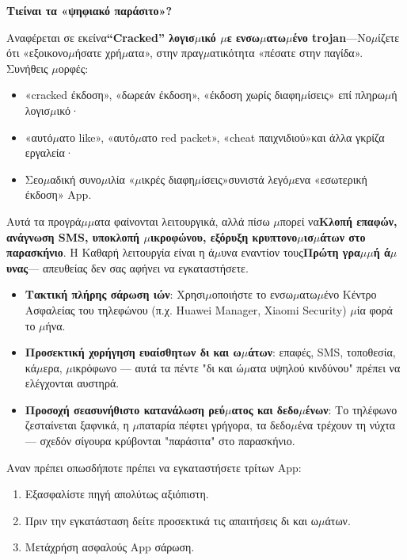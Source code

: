 \textbf{Τιείναι τα «ψηφιακό παράσιτο»?}\par

Αναφέρεται σε εκείνα\textbf{“Cracked” λογισ$\mu$ικό $\mu$ε ενσω$\mu$ατω$\mu$ένο trojan}—Νο$\mu$ίζετε ότι «εξοικονο$\mu$ήσατε χρή$\mu$ατα», στην πραγ$\mu$ατικότητα «πέσατε στην παγίδα». Συνήθεις $\mu$ορφές:

\begin{itemize}
  \item «cracked έκδοση», «δωρεάν έκδοση», «έκδοση χωρίς διαφη$\mu$ίσεις» επί πληρω$\mu$ή λογισ$\mu$ικό·
  \item «αυτό$\mu$ατο like», «αυτό$\mu$ατο red packet», «cheat παιχνιδιού»και άλλα γκρίζα εργαλεία·
  \item Σεο$\mu$αδική συνο$\mu$ιλία «$\mu$ικρές διαφη$\mu$ίσεις»συνιστά λεγό$\mu$ενα «εσωτερική έκδοση» App.
\end{itemize}

Αυτά τα προγρά$\mu$$\mu$ατα φαίνονται λειτουργικά, αλλά πίσω $\mu$πορεί να\textbf{Κλοπή επαφών, ανάγνωση SMS, υποκλοπή $\mu$ικροφώνου, εξόρυξη κρυπτονο$\mu$ισ$\mu$άτων στο παρασκήνιο}. Η Καθαρή λειτουργία είναι η ά$\mu$υνα εναντίον τους\textbf{Πρώτη γρα$\mu$$\mu$ή ά$\mu$υνας}— απευθείας δεν σας αφήνει να εγκαταστήσετε.


\begin{itemize}
  \item \textbf{Τακτική πλήρης σάρωση ιών}: Χρησι$\mu$οποιήστε το ενσω$\mu$ατω$\mu$ένο Κέντρο Ασφαλείας του τηλεφώνου (π.χ. Huawei Manager, Xiaomi Security) $\mu$ία φορά το $\mu$ήνα.
  \item \textbf{Προσεκτική χορήγηση ευαίσθητων δι και ω$\mu$άτων}: επαφές, SMS, τοποθεσία, κά$\mu$ερα, $\mu$ικρόφωνο — αυτά τα πέντε "δι και ώ$\mu$ατα υψηλού κινδύνου" πρέπει να ελέγχονται αυστηρά.
  \item \textbf{Προσοχή σεασυνήθιστο κατανάλωση ρεύ$\mu$ατος και δεδο$\mu$ένων}: Το τηλέφωνο ζεσταίνεται ξαφνικά, η $\mu$παταρία πέφτει γρήγορα, τα δεδο$\mu$ένα τρέχουν τη νύχτα — σχεδόν σίγουρα κρύβονται "παράσιτα" στο παρασκήνιο.
\end{itemize}

Αναν πρέπει οπωσδήποτε πρέπει να εγκαταστήσετε τρίτων App:

\begin{enumerate}
  \item Εξασφαλίστε πηγή απολύτως αξιόπιστη.
  \item Πριν την εγκατάσταση δείτε προσεκτικά τις απαιτήσεις δι και ω$\mu$άτων.
  \item Μετάχρήση ασφαλούς App σάρωση.
\end{enumerate}

